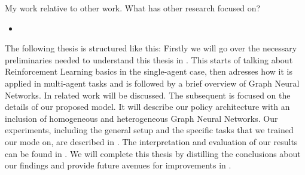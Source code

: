 My work relative to other work. What has other research focused on?
\begin{itemize}[noitemsep,nolistsep]
	\item 
\end{itemize} \par

The following thesis is structured like this: Firstly we will go over the necessary preliminaries needed to understand this thesis in . This starts of talking about Reinforcement Learning basics in the single-agent case, then adresses how it is applied in multi-agent tasks and is followed by a brief overview of Graph Neural Networks. In  related work will be discussed. The subsequent  is focused on the details of our proposed model. It will describe our policy architecture with an inclusion of homogeneous and heterogeneous Graph Neural Networks. Our experiments, including the general setup and the specific tasks that we trained our mode on, are described in . The interpretation and evaluation of our results can be found in . We will complete this thesis by distilling the conclusions about our findings and provide future avenues for improvements in .